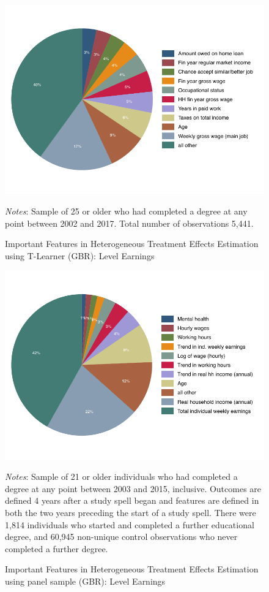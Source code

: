 \documentclass[12pt, a4paper]{article}
\begin{document}
\begin{figure}[htbp]
\centering
\caption{Important Features in Heterogeneous Treatment Effects Estimation using T-Learner (GBR): Level Earnings}
\vspace{0.5cm}
  \label{fig:featgbr}
    \includegraphics{_figures/influenceP_GBR_le_100.pdf}
\parbox{1\textwidth}{\footnotesize{\textit{Notes}: Sample of 25 or older who had completed a degree at any point between 2002 and 2017. Total number of observations 5,441.}}
\end{figure}


\begin{figure}[htbp]
\centering
\caption{Important Features in Heterogeneous Treatment Effects Estimation using panel sample (GBR): Level Earnings}
\vspace{0.5cm}
  \label{fig:featgbr_panel}
    \includegraphics{_figures/influenceP_GBR_csnopoly.pdf}
\parbox{1\textwidth}{\footnotesize{\textit{Notes}: Sample of 21 or older individuals who had completed a degree at any point between 2003 and 2015, inclusive. Outcomes are defined 4 years after a study spell began and features are defined in both the two years preceding the start of a study spell. There were 1,814 individuals who started and completed a further educational degree, and 60,945 non-unique control observations who never completed a further degree.}}
\end{figure}
\end{document}
